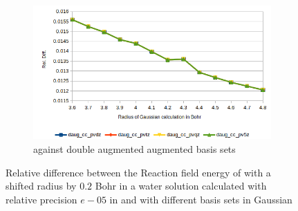 \documentclass[../master_thesis.tex]{subfiles}
\begin{document}
\begin{figure}[h!]
\begin{subfigure}[b]{0.75\linewidth}
    \includegraphics[width=\linewidth]{img/lipdaugreldiff02.png}
    \caption{\mrchem against double augmented augmented basis sets}
  \end{subfigure}
  \caption[Relative difference between methods for  with radius $+0.2$ Bohr]{Relative difference between the Reaction field energy of  with a shifted radius by $0.2$ Bohr in a water solution calculated with relative precision $e-05$ in \mrchem
  and with different basis sets in Gaussian}
  \label{fig:lipreldiff02}
\end{figure}
\end{document}
